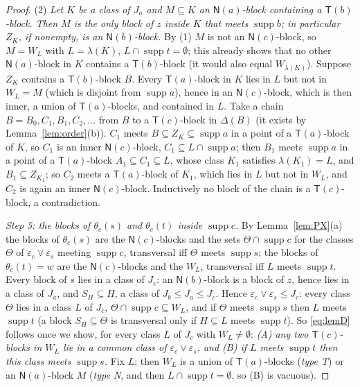 \documentclass[11pt]{amsart}
\theoremstyle{definition}
\newcommand{\supp}{\operatorname{supp}}
\newcommand{\T}{\mathsf{T}}
\newcommand{\N}{\mathsf{N}}
\begin{document}
\begin{proof}
(2) \emph{Let $K$ be a class of $J_a$ and $M\subseteq K$ an $\N(a)$-block containing a $\T(b)$-block. Then $M$ is the only block of $z$ inside $K$ that meets $\supp b$; in particular $Z_K$, if nonempty, is an $\N(b)$-block.} By (1) $M$ is not an $\N(c)$-block, so $M=W_L$ with $L=\lambda(K)$, $L\cap\supp t=\emptyset$; this already shows that no other $\N(a)$-block in $K$ contains a $\T(b)$-block (it would also equal $W_{\lambda(K)}$). Suppose $Z_K$ contains a $\T(b)$-block $B$. Every $\T(a)$-block in $K$ lies in $L$ but not in $W_L=M$ (which is disjoint from $\supp a$), hence in an $\N(c)$-block, which is then inner, a union of $\T(a)$-blocks, and contained in $L$. Take a chain $B=B_0,C_1,B_1,C_2,\dots$ from $B$ to a $\T(c)$-block in $\Delta(B)$ (it exists by Lemma~\ref{lem:order}(b)). $C_1$ meets $B\subseteq Z_K\subseteq\supp a$ in a point of a $\T(a)$-block of $K$, so $C_1$ is an inner $\N(c)$-block, $C_1\subseteq L\cap\supp a$; then $B_1$ meets $\supp a$ in a point of a $\T(a)$-block $A_1\subseteq C_1\subseteq L$, whose class $K_1$ satisfies $\lambda(K_1)=L$, and $B_1\subseteq Z_{K_1}$; so $C_2$ meets a $\T(a)$-block of $K_1$, which lies in $L$ but not in $W_L$, and $C_2$ is again an inner $\N(c)$-block. Inductively no block of the chain is a $\T(c)$-block, a contradiction.

\emph{Step 5: the blocks of $\theta_c(s)$ and $\theta_c(t)$ inside $\supp c$.} By Lemma~\ref{lem:PX}(a) the blocks of $\theta_c(s)$ are the $\N(c)$-blocks and the sets $\Theta\cap\supp c$ for the classes $\Theta$ of $\varepsilon_c\vee\varepsilon_s$ meeting $\supp c$, transversal iff $\Theta$ meets $\supp s$; the blocks of $\theta_c(t)=w$ are the $\N(c)$-blocks and the $W_L$, transversal iff $L$ meets $\supp t$. Every block of $s$ lies in a class of $J_c$: an $\N(b)$-block is a block of $z$, hence lies in a class of $J_a$, and $S_H\subseteq H$, a class of $J_b\le J_a\le J_c$. Hence $\varepsilon_c\vee\varepsilon_s\le J_c$: every class $\Theta$ lies in a class $L$ of $J_c$, $\Theta\cap\supp c\subseteq W_L$, and if $\Theta$ meets $\supp s$ then $L$ meets $\supp t$ (a block $S_H\subseteq\Theta$ is transversal only if $H\subseteq L$ meets $\supp t$). So \eqref{eq:lemD} follows once we show, for every class $L$ of $J_c$ with $W_L\ne\emptyset$: \emph{(A) any two $\T(c)$-blocks in $W_L$ lie in a common class of $\varepsilon_c\vee\varepsilon_s$, and (B) if $L$ meets $\supp t$ then this class meets $\supp s$.} Fix $L$; then $W_L$ is a union of $\T(a)$-blocks (\emph{type T}) or an $\N(a)$-block $M$ (\emph{type N}, and then $L\cap\supp t=\emptyset$, so (B) is vacuous).


\end{proof}
\end{document}
